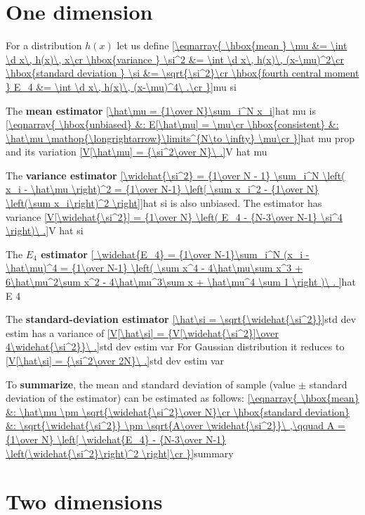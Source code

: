 

\parindent=5mm

\SetFontSizesX

\section{One dimension}

For a distribution $h(x)$ let us define
\eqref{\eqnarray{
\hbox{mean } \mu &= \int \d x\, h(x)\, x\cr
\hbox{variance } \si^2 &= \int \d x\, h(x)\, (x-\mu)^2\cr
\hbox{standard deviation } \si &= \sqrt{\si^2}\cr
\hbox{fourth central moment } E_4 &= \int \d x\, h(x)\, (x-\mu)^4\ .\cr
}}{mu si}

The {\bf mean estimator}
\eqref{\hat\mu = {1\over N}\sum_i^N x_i}{hat mu}
is
\eqref{\eqnarray{
\hbox{unbiased} &: E[\hat\mu] = \mu\cr
\hbox{consistent} &: \hat\mu \mathop{\longrightarrow}\limits^{N\to \infty} \mu\cr
}}{hat mu prop}
and its variation
\eqref{V[\hat\mu] = {\si^2\over N}\ .}{V hat mu}

The {\bf variance estimator}
\eqref{\widehat{\si^2} = {1\over N - 1} \sum_i^N \left( x_i - \hat\mu \right)^2 = {1\over N-1} \left[ \sum x_i^2 - {1\over N} \left(\sum x_i\right)^2 \right]}{hat si}
is also unbiased. The estimator has variance
\eqref{V[\widehat{\si^2}] = {1\over N} \left( E_4 - {N-3\over N-1} \si^4 \right)\ .}{V hat si}

The {\bf $E_4$ estimator}
\eqref{
	\widehat{E_4} = {1\over N-1}\sum_i^N (x_i - \hat\mu)^4 = 
	{1\over N-1} \left( \sum x^4 - 4\hat\mu\sum x^3 + 6\hat\mu^2\sum x^2 - 4\hat\mu^3\sum x + \hat\mu^4 \sum 1 \right )\ .
}{hat E 4}

The {\bf standard-deviation estimator}
\eqref{\hat\si = \sqrt{\widehat{\si^2}}}{std dev estim}
has a variance of
\eqref{V[\hat\si] = {V[\widehat{\si^2}]\over 4\widehat{\si^2}}\ .}{std dev estim var}
For Gaussian distribution it reduces to
\eqref{V[\hat\si] = {\si^2\over 2N}\ .}{std dev estim var}

To {\bf summarize}, the mean and standard deviation of sample (value $\pm$ standard deviation of the estimator) can be estimated as follows:
\eqref{\eqnarray{
\hbox{mean} &: \hat\mu \pm \sqrt{\widehat{\si^2}\over N}\cr
\hbox{standard deviation} &: \sqrt{\widehat{\si^2}} \pm \sqrt{A\over \widehat{\si^2}}\ ,\qquad A = {1\over N} \left[ \widehat{E_4} - {N-3\over N-1} \left(\widehat{\si^2}\right)^2 \right]\cr
}}{summary}


\vfil
\eject


\section{Two dimensions}

